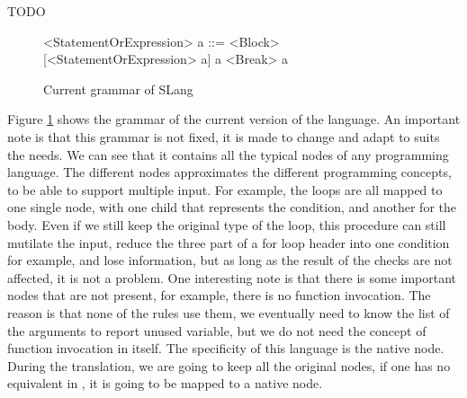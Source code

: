 TODO

\setlength{\grammarparsep}{20pt plus 1pt minus 1pt} %
\setlength{\grammarindent}{12em} %
\begin{figure}[h]
	\caption{Current grammar of SLang}
	\label{figure:slang_grammar}
	\begin{grammar}
		<StatementOrExpression> a ::=	<Block> [<StatementOrExpression> a] a
		\alt  <Break> a
	\end{grammar}
\end{figure}


Figure \ref{figure:slang_grammar} shows the grammar of the current version of the language.
An important note is that this grammar is not fixed, it is made to change and adapt to suits the needs. 
We can see that it contains all the typical nodes of any programming language.
The different nodes approximates the different programming concepts, to be able to support multiple input. 
For example, the loops are all mapped to one single node, with one child that represents the condition, and another for the body. 
Even if we still keep the original type of the loop, this procedure can still mutilate the input, reduce the three part of a for loop header into one condition for example, and lose information, but as long as the result of the checks are not affected, it is not a problem.
One interesting note is that there is some important nodes that are not present, for example, there is no function invocation. 
The reason is that none of the rules use them, we eventually need to know the list of the arguments to report unused variable, but we do not need the concept of function invocation in itself.
The specificity of this language is the native node. 
During the translation, we are going to keep all the original nodes, if one has no equivalent in \slang, it is going to be mapped to a native node.

